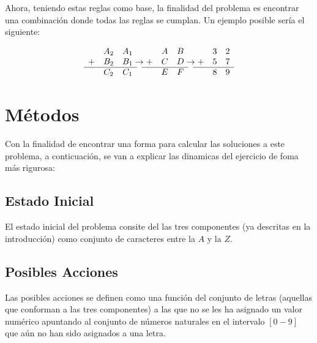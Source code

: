 \documentclass[11pt]{article}
\begin{document}
Ahora, teniendo estas reglas como base, la finalidad del problema es encontrar
una combinación donde todas las reglas se cumplan. Un ejemplo posible sería el siguiente:

\begin{align*}
\begin{matrix}
 &A_2&A_1\\
+&B_2&B_1\\ \hline
 &C_2&C_1\\
\end{matrix}
\to
\begin{matrix}
 &A&B\\
+&C&D\\ \hline
 &E&F\\
\end{matrix}
\to
\begin{matrix}
 &3&2\\
+&5&7\\ \hline
 &8&9\\
\end{matrix}
\end{align*}


\section{Métodos}
\label{sec:org4ef7443}

Con la finalidad de encontrar una forma para calcular las soluciones a este
problema, a conticuación, se van a explicar las dinamicas del ejercicio de foma
más rigurosa:

\subsection{Estado Inicial}
\label{sec:orga703106}

El estado inicial del problema consite del las tres componentes (ya descritas en
la introducción) como conjunto de caracteres entre la \(A\) y la \(Z\).

\subsection{Posibles Acciones}
\label{sec:org056505b}

Las posibles acciones se definen como una función del conjunto de letras
(aquellas que conforman a las tres componentes) a las que no se les ha asignado
un valor numérico apuntando al conjunto de números naturales en el intervalo
\(\left[0-9\right]\) que aún no han sido asignados a una letra.
\end{document}
